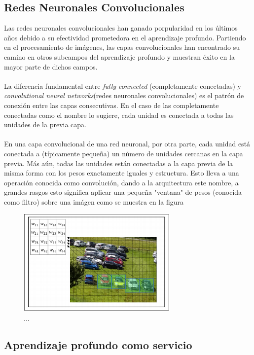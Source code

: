     \subsection{Redes Neuronales Convolucionales}
    Las redes neuronales convolucionales han ganado porpularidad en los últimos años debido a su efectividad prometedora en el aprendizaje profundo. Partiendo en el procesamiento de imágenes, las capas convolucionales han encontrado su camino en otros subcampos del aprendizaje profundo y muestran éxito en la mayor parte de dichos campos.\\\\ 
    La diferencia fundamental entre \textit{fully connected} (completamente conectadas) y \textit{convolutional neural networks}(redes neuronales convolucionales) es el patrón de conexión entre las capas consecutivas. En el caso de las completamente conectadas como el nombre lo sugiere, cada unidad es conectada a todas las unidades de la previa capa. \\\\
    En una capa convolucional de una red neuronal, por otra parte, cada unidad está conectada a (típicamente pequeña) un número de unidades cercanas en la capa previa. Más aún, todas las unidades están conectadas a la capa previa de la misma forma con los pesos exactamente iguales y estructura. Esto lleva a una operación conocida como convolución, dando a la arquitectura este nombre, a grandes rasgos esto significa aplicar una pequeña "ventana" de pesos (conocida como filtro) sobre una imágen como se muestra en la figura %
    
    
     \begin{figure}[H]
        \centering
        \includegraphics[width=0.7\textwidth]{capitulo2/images/CNN_window.png}
        \caption{...}
        \label{fig:CNNFilter}
    \end{figure}
    
    
    \subsection{Aprendizaje profundo como servicio}

